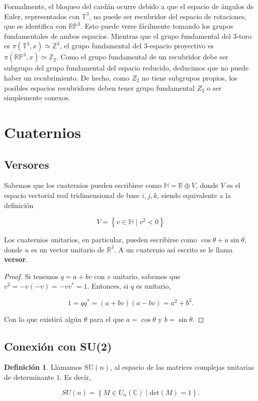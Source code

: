 \documentclass{article}
\theoremstyle{plain}
\theoremstyle{definition}
\newtheorem{definition}{Definición}
\theoremstyle{remark}
\begin{document}
Formalmente, el bloqueo del cardán ocurre debido a que el espacio de ángulos de Euler, representados con $\mathbb T^3$,
no puede ser recubridor del espacio de rotaciones, que se identifica con $\mathbb{RP}^3$. Esto puede verse
fácilmente tomando los grupos fundamentales de ambos espacios. Mientras que el grupo fundamental del 3-toro es
$\pi(\mathbb T^3, x) \simeq \mathbb Z^3$, el grupo fundamental del 3-espacio proyectivo es $\pi(\mathbb{RP}^3, x)
\simeq \mathbb Z_2$. Como el grupo fundamental de un recubridor debe ser subgrupo del grupo fundamental del espacio
reducido, deducimos que no puede haber un recubrimiento. De hecho, como $Z_2$ no tiene subgrupos propios, los posibles
espacios recubridores deben tener grupo fundamental $Z_2$ o ser simplemente conexos.

\section{Cuaternios}
\subsection{Versores}
Sabemos que los cuaternios pueden escribirse como
$\mathbb{H} = \mathbb{R} \oplus V$, donde $V$ es el espacio vectorial
real tridimensional de base $i,j,k$, siendo equivalente a la
definición

\[
  V = \left\{ v \in \mathbb{H} \mid v^2 < 0 \right\}
\]

Los cuaternios unitarios, en particular, pueden escribirse como
$\cos \theta + u \sin \theta$, donde $u$ es un vector unitario de
$\mathbb{R}^3$. A un cuaternio así escrito se le llama
\textbf{versor}.

\begin{proof}
  Si tenemos $q = a + bv$ con $v$ unitario, sabemos que $v^2 = - v(-v) = - vv^\ast = 1$.
  Entonces, si $q$ es unitario,

  \[
    1 = qq^\ast = (a+bv)(a-bv) = a^2 + b^2.
  \]

  Con lo que existirá algún $\theta$ para el que $a = \cos \theta$ y $b = \sin \theta$.
\end{proof}

\subsection{Conexión con SU(2)}
\cite{gelfand63}

\begin{definition}
  Llamamos $\mathrm{SU}(n)$, al espacio de las matrices complejas unitarias de determinante $1$.
  Es decir,

  \[SU(n) = \left\{ M \in U_n(\mathbb{C}) \mid \mathrm{det}(M) = 1 \right\}.\]
\end{definition}
\end{document}
